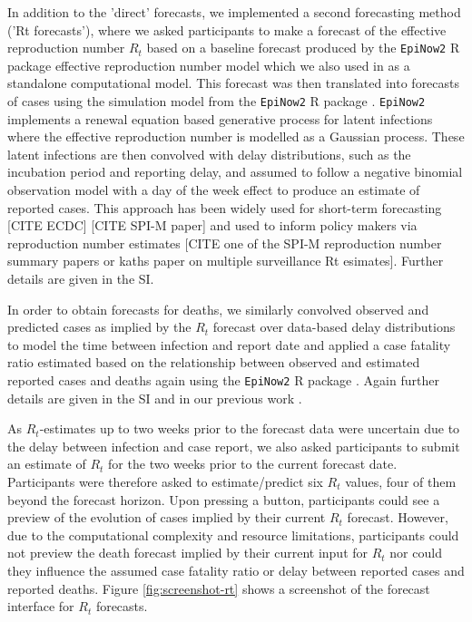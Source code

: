\documentclass[10pt,a4paper,twocolumn]{article}
\begin{document}
In addition to the 'direct' forecasts, we implemented a second forecasting method ('Rt forecasts'), where we asked participants to make a forecast of the effective reproduction number $R_t$ based on a baseline forecast produced by the \texttt{EpiNow2} \textsf{R} package effective reproduction number model \citep{epinow2} which we also used in \cite{bosseComparingHumanModelbased2022} as a standalone computational model. This forecast was then translated into forecasts of cases using the simulation model from the \texttt{EpiNow2} \textsf{R} package \citep{epinow2}. \texttt{EpiNow2} implements a renewal equation based \citep{fraserEstimatingIndividualHousehold2007}  generative process for latent infections where the effective reproduction number is modelled as a Gaussian process. These latent infections are then convolved with delay distributions, such as the incubation period and reporting delay, and assumed to follow a negative binomial observation model with a day of the week effect to produce an estimate of reported cases. This approach has been widely used for short-term forecasting \cite{bosseComparingHumanModelbased2022} [CITE ECDC] [CITE SPI-M paper] and used to inform policy makers via reproduction number estimates [CITE one of the SPI-M reproduction number summary papers or kaths paper on multiple surveillance Rt esimates]. Further details are given in the SI.

In order to obtain forecasts for deaths, we similarly convolved observed and predicted cases as implied by the $R_t$ forecast over data-based delay distributions \cite{sherrattExploringSurveillanceData2021, abbottEstimatingTimevaryingReproduction2020a} to model the time between infection and report date  and applied a case fatality ratio estimated based on the relationship between observed and estimated reported cases and deaths again using the \texttt{EpiNow2} \textsf{R} package \citep{epinow2}. Again further details are given in the SI and in our previous work .

As $R_t$-estimates up to two weeks prior to the forecast data were uncertain due to the delay between infection and case report, we also asked participants to submit an estimate of $R_t$ for the two weeks prior to the current forecast date. Participants were therefore asked to estimate/predict six $R_t$ values, four of them beyond the forecast horizon. Upon pressing a button, participants could see a preview of the evolution of cases implied by their current $R_t$ forecast. However, due to the computational complexity and resource limitations, participants could not preview the death forecast implied by their current input for $R_t$ nor could they influence the assumed case fatality ratio or delay between reported cases and reported deaths. Figure \ref{fig:screenshot-rt} shows a screenshot of the forecast interface for $R_t$ forecasts. 
\end{document}
